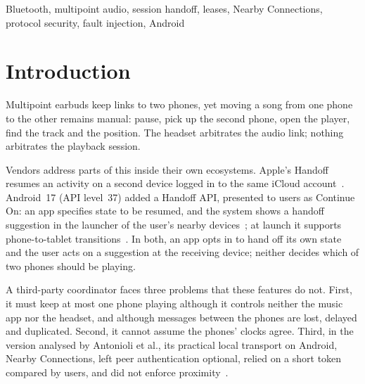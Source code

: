 \documentclass[conference]{IEEEtran}
\begin{document}
\begin{IEEEkeywords}
Bluetooth, multipoint audio, session handoff, leases, Nearby Connections, protocol security, fault injection, Android
\end{IEEEkeywords}

\section{Introduction}

Multipoint earbuds keep links to two phones, yet moving a song from one phone to the other remains manual: pause, pick up the second phone, open the player, find the track and the position. The headset arbitrates the audio link; nothing arbitrates the playback session.

Vendors address parts of this inside their own ecosystems. Apple's Handoff resumes an activity on a second device logged in to the same iCloud account~\cite{stute2021}. Android~17 (API level~37) added a Handoff API, presented to users as Continue On: an app specifies state to be resumed, and the system shows a handoff suggestion in the launcher of the user's nearby devices~\cite{android17,continueon}; at launch it supports phone-to-tablet transitions~\cite{continueon}. In both, an app opts in to hand off its own state and the user acts on a suggestion at the receiving device; neither decides which of two phones should be playing.

A third-party coordinator faces three problems that these features do not. First, it must keep at most one phone playing although it controls neither the music app nor the headset, and although messages between the phones are lost, delayed and duplicated. Second, it cannot assume the phones' clocks agree. Third, in the version analysed by Antonioli et al., its practical local transport on Android, Nearby Connections, left peer authentication optional, relied on a short token compared by users, and did not enforce proximity~\cite{antonioli2019}.
\end{document}
